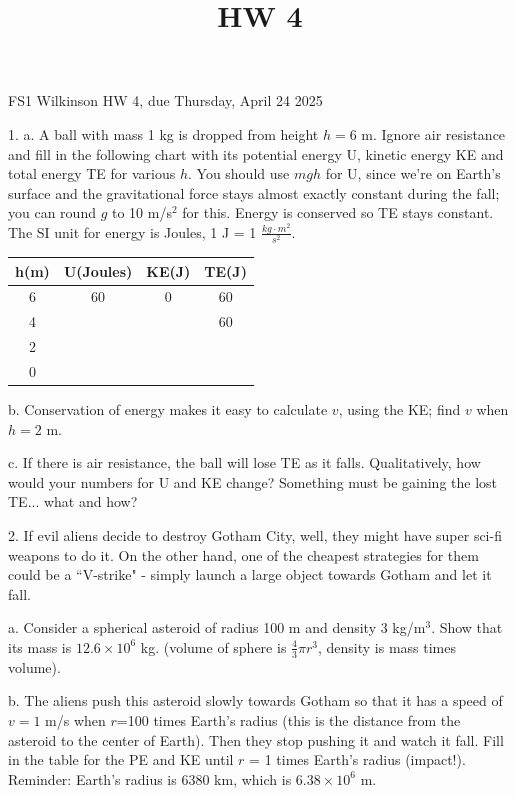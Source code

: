 \documentclass[12pt]{article}
\title{HW 4}
\begin{document}
\setlength{\parindent}{0pt}
\setlength{\parskip}{3mm}

FS1 Wilkinson HW 4, due Thursday, April 24 2025

1. a. A ball with mass 1 kg is dropped from height $h=6$ m. Ignore air resistance and fill in the following chart with its potential energy U, kinetic energy KE and total energy TE for various $h$. You should use $mgh$ for U, since we're on Earth's surface and the gravitational force stays almost exactly constant during the fall; you can round $g$ to 10 m/s$^2$ for this. Energy is conserved so TE stays constant. The SI unit for energy is Joules, 1 J = 1 $\frac{kg\cdot m^2}{s^2}$.

\begin{tabular}{c |c |c |c} %
h(m) & U(Joules) & KE(J) & TE(J)\\ [0.5ex] %
\hline %
6 & 60 & 0 & 60 \\ %
4 &  &  & 60 \\
2 &  &  &  \\
0 &  &  &  \\ [1ex] %
\hline %
\end{tabular}

b. Conservation of energy makes it easy to calculate $v$, using the KE; find $v$ when $h=2$ m. 

c. If there is air resistance, the ball will lose TE as it falls. Qualitatively, how would your numbers for U and KE change? Something must be gaining the lost TE... what and how?


2. If evil aliens decide to destroy Gotham City, well, they might have super sci-fi weapons to do it. On the other hand, one of the cheapest strategies for them could be a ``V-strike" - simply launch a large object towards Gotham and let it fall. 

a. Consider a spherical asteroid of radius 100 m and density 3 kg/m$^3$. Show that its mass is $12.6 \times 10^6$ kg. (volume of sphere is $\frac{4}{3}\pi r^3$, density is mass times volume). 

b. The aliens push this asteroid slowly towards Gotham so that it has a speed of $v=1$ m/s when $r$=100 times Earth's radius (this is the distance from the asteroid to the center of Earth). Then they stop pushing it and watch it fall. Fill in the table for the PE and KE until $r$ = 1 times Earth's radius (impact!). Reminder: Earth's radius is 6380 km, which is $6.38 \times 10^6$ m.
\end{document}
